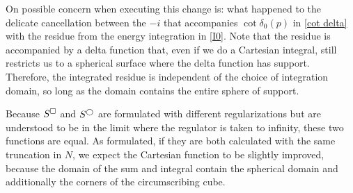 On possible concern when executing this change is: what happened to the delicate cancellation between the $-i$ that accompanies $\cot\delta_0(p)$ in \eqref{cot delta} with the residue from the energy integration in \eqref{I0}.
Note that the residue is accompanied by a delta function that, even if we do a Cartesian integral, still restricts us to a spherical surface where the delta function has support.
Therefore, the integrated residue is independent of the choice of integration domain, so long as the domain contains the entire sphere of support.

Because $S^{\square}$ and $S^{\bigcirc}$ are formulated with different regularizations but are understood to be in the limit where the regulator is taken to infinity, these two functions are equal.
As formulated, if they are both calculated with the same truncation in $N$, we expect the Cartesian function to be slightly improved, because the domain of the sum and integral contain the spherical domain and additionally the corners of the circumscribing cube.
